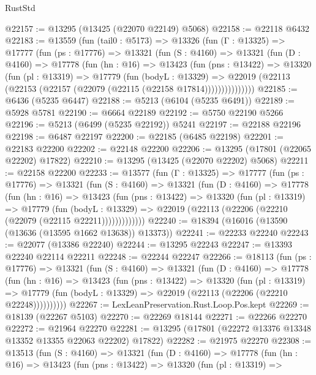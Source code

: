 \begin{lexlean}{RustStd}
\begin{coremodule}
@22157 := @13295 (@13425 (@22070 @22149) @5068)
@22158 := @22118 @6432
@22183 := @13559
    (fun (tail0 : @5173) =>
    @13326
      (fun (Γ : @13325) =>
      @17777
        (fun (ps : @17776) =>
        @13321
          (fun (S : @4160) =>
          @13321
            (fun (D : @4160) =>
            @17778
              (fun (hn : @16) =>
              @13423
                (fun (pns : @13422) =>
                @13320
                  (fun (pl : @13319) =>
                  @17779
                    (fun (bodyL : @13329) =>
                    @22019 (@22113 (@22153 (@22157 (@22079 (@22115 (@22158 @17814)))))))))))))))
@22185 := @6436 (@5235 @6447)
@22188 := @5213 (@6104 (@5235 @6491))
@22189 := @5928 @5781
@22190 := @6664 @22189
@22192 := @5750 @22190 @5266
@22196 := @5213 (@6499 (@5235 @22192)) @5241
@22197 := @22188 @22196
@22198 := @6487 @22197
@22200 := @22185 (@6485 @22198)
@22201 := @22183 @22200
@22202 := @22148 @22200
@22206 := @13295 (@17801 (@22065 @22202) @17822)
@22210 := @13295 (@13425 (@22070 @22202) @5068)
@22211 := @22158 @22200
@22233 := @13577
    (fun (Γ : @13325) =>
    @17777
      (fun (ps : @17776) =>
      @13321
        (fun (S : @4160) =>
        @13321
          (fun (D : @4160) =>
          @17778
            (fun (hn : @16) =>
            @13423
              (fun (pns : @13422) =>
              @13320
                (fun (pl : @13319) =>
                @17779
                  (fun (bodyL : @13329) =>
                  @22019 (@22113 (@22206 (@22210 (@22079 (@22115 @22211)))))))))))))
@22240 := @18394 (@16016 (@13590 (@13636 (@13595 @1662 @13638)) @13373))
@22241 := @22233 @22240
@22243 := @22077 (@13386 @22240)
@22244 := @13295 @22243
@22247 := @13393 @22240 @22114 @22211
@22248 := @22244 @22247
@22266 := @18113
    (fun (ps : @17776) =>
    @13321
      (fun (S : @4160) =>
      @13321
        (fun (D : @4160) =>
        @17778
          (fun (hn : @16) =>
          @13423
            (fun (pns : @13422) =>
            @13320
              (fun (pl : @13319) =>
              @17779 (fun (bodyL : @13329) => @22019 (@22113 (@22206 (@22210 @22248))))))))))
@22267 := LexLeanPreservation.Rust.Loop.Pos.kept
@22269 := @18139 (@22267 @5103)
@22270 := @22269 @18144
@22271 := @22266 @22270
@22272 := @21964 @22270
@22281 := @13295 (@17801 (@22272 @13376 @13348 @13352 @13355 @22063 @22202) @17822)
@22282 := @21975 @22270
@22308 := @13513
    (fun (S : @4160) =>
    @13321
      (fun (D : @4160) =>
      @17778
        (fun (hn : @16) =>
        @13423
          (fun (pns : @13422) =>
          @13320
            (fun (pl : @13319) =>

\end{coremodule}
\end{lexlean}
